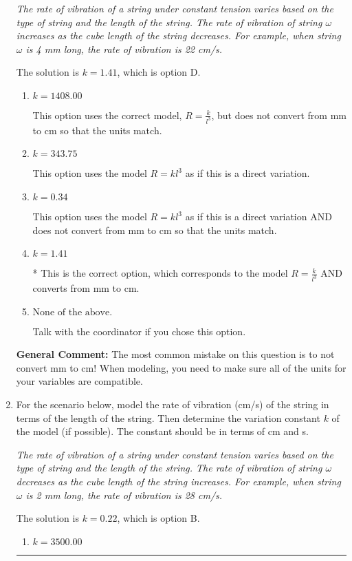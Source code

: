 \documentclass{extbook}[14pt]
\newcommand{\litem}[1]{\item #1

\rule{\textwidth}{0.4pt}}
\begin{document}
\begin{enumerate}
{\begin{center}
    \textit{ The rate of vibration of a string under constant tension varies based on the type of string and the length of the string. The rate of vibration of string $\omega$ increases as the cube length of the string decreases. For example, when string $\omega$ is 4 mm long, the rate of vibration is 22 cm/s. }
\end{center}
The solution is \( k = 1.41 \), which is option D.\begin{enumerate}[label=\Alph*.]
\item \( k = 1408.00 \)

This option uses the correct model, $R = \frac{k}{l^{3}}$, but does not convert from mm to cm so that the units match.
\item \( k = 343.75 \)

This option uses the model $R = kl^{3}$ as if this is a direct variation.
\item \( k = 0.34 \)

This option uses the model $R = kl^{3}$ as if this is a direct variation AND does not convert from mm to cm so that the units match.
\item \( k = 1.41 \)

* This is the correct option, which corresponds to the model $R = \frac{k}{l^{3}}$ AND converts from mm to cm.
\item \( \text{None of the above.} \)

Talk with the coordinator if you chose this option.
\end{enumerate}

\textbf{General Comment:} The most common mistake on this question is to not convert mm to cm! When modeling, you need to make sure all of the units for your variables are compatible.
}
\litem{
For the scenario below, model the rate of vibration (cm/s) of the string in terms of the length of the string. Then determine the variation constant $k$ of the model (if possible). The constant should be in terms of cm and s.

\begin{center}
    \textit{ The rate of vibration of a string under constant tension varies based on the type of string and the length of the string. The rate of vibration of string $\omega$ decreases as the cube length of the string increases. For example, when string $\omega$ is 2 mm long, the rate of vibration is 28 cm/s. }
\end{center}
The solution is \( k = 0.22 \), which is option B.\begin{enumerate}[label=\Alph*.]
\item \( k = 3500.00 \)


\end{enumerate}}
\end{enumerate}
\end{document}
